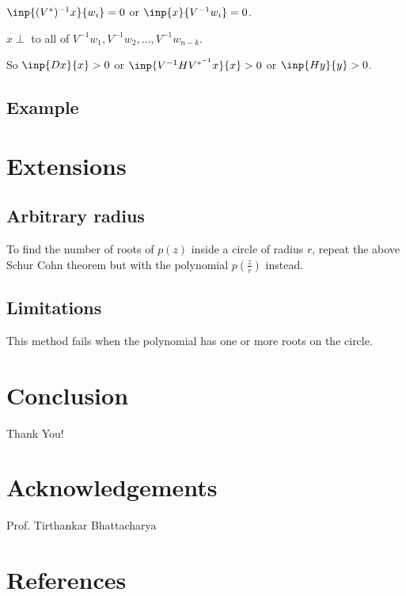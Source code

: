 \documentclass[twofold]{article}
\newcommand*\adj[1]{#1^*}
\theoremstyle{plain}
\theoremstyle{definition}
\theoremstyle{remark}
\begin{document}
\(\inp{(\adj{V})^{-1}x}{w_i} = 0\) or \( \inp{x}{V^{-1} w_i} = 0\).

\(x \perp\) to all of \(V^{-1}w_1,  V^{-1} w_2, \ldots , V^{-1} w_{n-k}\).

So \(\inp{Dx}{x} > 0\) or \(\inp{V^{-1} H V^{*^{-1}} x}{x} > 0\) or \(\inp{Hy}{y} > 0\).
\subsection{Example}

\section{Extensions}

\subsection{Arbitrary radius}
To find the number of roots of \(p(z)\) inside a circle of radius \(r\), repeat the above Schur Cohn theorem but with the polynomial \(p(\frac{z}{r})\) instead. 
\subsection{Limitations}
This method fails when the polynomial has one or more roots on the circle. 

\section{Conclusion}
Thank You!

\section{Acknowledgements}
Prof. Tirthankar Bhattacharya

\section{References}
\end{document}
